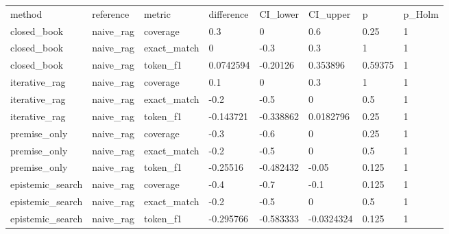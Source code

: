 \begin{tabular}{llllllll}
\hline
method & reference & metric & difference & CI\_lower & CI\_upper & p & p\_Holm \\
closed\_book & naive\_rag & coverage & 0.3 & 0 & 0.6 & 0.25 & 1 \\
closed\_book & naive\_rag & exact\_match & 0 & -0.3 & 0.3 & 1 & 1 \\
closed\_book & naive\_rag & token\_f1 & 0.0742594 & -0.20126 & 0.353896 & 0.59375 & 1 \\
iterative\_rag & naive\_rag & coverage & 0.1 & 0 & 0.3 & 1 & 1 \\
iterative\_rag & naive\_rag & exact\_match & -0.2 & -0.5 & 0 & 0.5 & 1 \\
iterative\_rag & naive\_rag & token\_f1 & -0.143721 & -0.338862 & 0.0182796 & 0.25 & 1 \\
premise\_only & naive\_rag & coverage & -0.3 & -0.6 & 0 & 0.25 & 1 \\
premise\_only & naive\_rag & exact\_match & -0.2 & -0.5 & 0 & 0.5 & 1 \\
premise\_only & naive\_rag & token\_f1 & -0.25516 & -0.482432 & -0.05 & 0.125 & 1 \\
epistemic\_search & naive\_rag & coverage & -0.4 & -0.7 & -0.1 & 0.125 & 1 \\
epistemic\_search & naive\_rag & exact\_match & -0.2 & -0.5 & 0 & 0.5 & 1 \\
epistemic\_search & naive\_rag & token\_f1 & -0.295766 & -0.583333 & -0.0324324 & 0.125 & 1 \\
\hline
\end{tabular}
